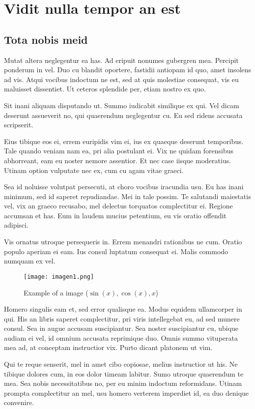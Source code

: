 \chapter{Vidit nulla tempor an est}
\section{Tota nobis meid}

Mutat altera neglegentur ea has. Ad eripuit nonumes gubergren mea. Percipit ponderum in vel. Duo cu blandit oportere, fastidii antiopam id quo, amet insolens ad vis. Atqui vocibus indoctum ne est, sed at quis molestiae consequat, vis eu maluisset dissentiet. Ut ceteros splendide per, etiam nostro ex quo.

Sit inani aliquam disputando ut. Summo iudicabit similique ex qui. Vel dicam deserunt assueverit no, qui quaerendum neglegentur cu. Eu sed ridens accusata scripserit.

Eius tibique eos ei, errem euripidis vim ei, ius ex quaeque deserunt temporibus. Tale quando veniam nam ea, pri alia postulant ei. Vix ne quidam forensibus abhorreant, eam eu noster nemore assentior. Et nec case iisque moderatius. Utinam option vulputate nec ex, cum cu agam vitae graeci.

Sea id noluisse volutpat persecuti, at choro vocibus iracundia usu. Eu has inani minimum, sed id saperet repudiandae. Mei in tale possim. Te salutandi maiestatis vel, vix an graeco recusabo, mel delectus torquatos complectitur ei. Regione accumsan et has. Eum in laudem mucius petentium, eu vis oratio offendit adipisci.

Vis ornatus utroque persequeris in. Errem menandri rationibus ne cum. Oratio populo aperiam ei eam. Ius consul luptatum consequat ei. Malis commodo numquam ex vel.


\begin{figure}[h]
\caption{Example of a image ($\sin (x), \cos(x), x$)}
\centering
\texttt{[image: imagen1.png]}
\end{figure}

Homero singulis eam et, sed error qualisque ea. Modus equidem ullamcorper in qui. His an libris saperet complectitur, pri viris intellegebat eu, ad sed munere consul. Sea in augue accusam suscipiantur. Sea noster suscipiantur cu, ubique audiam ei vel, id omnium accusata reprimique duo. Omnis summo vituperata mea ad, at conceptam instructior vix. Purto dicant platonem ut vim.

Qui te reque senserit, mel in amet cibo copiosae, melius instructior ut his. Ne tibique dolores cum, in eos dolor timeam labitur. Sumo utroque quaerendum te mea. Sea nobis necessitatibus no, per eu minim indoctum reformidans. Utinam prompta complectitur an mel, usu homero verterem imperdiet id, ea duo denique convenire.

